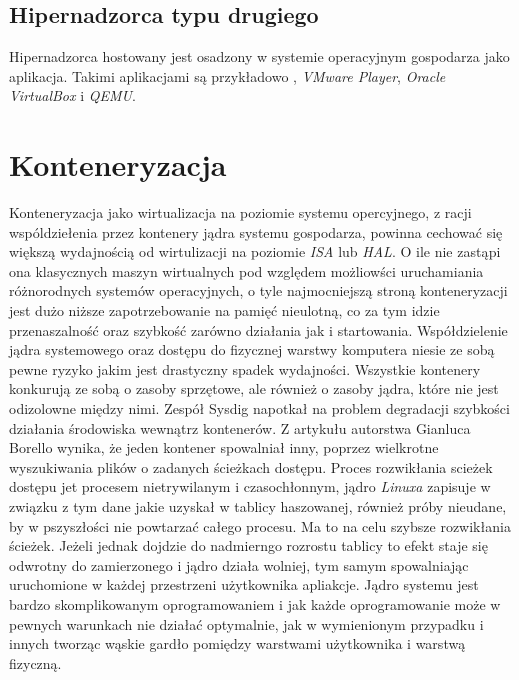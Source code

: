 \documentclass[polish, a4paper, 12pt, oneside]{book}
\begin{document}
\subsection {Hipernadzorca typu drugiego} 
Hipernadzorca hostowany jest osadzony w systemie operacyjnym gospodarza jako aplikacja. Takimi aplikacjami są przykładowo \cite{VMware Workstation}, \textit{VMware Player}\cite{vmwareplayer}, \textit{Oracle VirtualBox}\cite{virtualbox} i \textit{QEMU}\cite{qemu}.

\section{Konteneryzacja}
Konteneryzacja jako wirtualizacja na poziomie systemu opercyjnego, z racji wspóldziełenia przez kontenery jądra systemu gospodarza, powinna cechować się większą wydajnością od wirtulizacji na poziomie \textit{ISA} lub \textit{HAL}. O ile nie zastąpi ona klasycznych maszyn wirtualnych pod względem możliowści uruchamiania różnorodnych systemów operacyjnych, o tyle najmocniejszą stroną konteneryzacji jest dużo niższe zapotrzebowanie na pamięć nieulotną, co za tym idzie przenaszalność oraz szybkość zarówno działania jak i startowania. Współdzielenie jądra systemowego oraz dostępu do fizycznej warstwy komputera niesie ze sobą pewne ryzyko jakim jest drastyczny spadek wydajności. Wszystkie kontenery konkurują ze sobą o zasoby sprzętowe, ale również o zasoby jądra, które nie jest odizolowne między nimi. Zespół Sysdig napotkał na problem degradacji szybkości działania środowiska wewnątrz kontenerów. Z artykułu autorstwa Gianluca Borello\cite{sd17} wynika, że jeden kontener spowalniał inny, poprzez wielkrotne wyszukiwania plików o zadanych ścieżkach dostępu. Proces rozwikłania scieżek dostępu jet procesem nietrywilanym i czasochłonnym, jądro \textit{Linuxa} zapisuje w związku z tym dane jakie uzyskał w tablicy haszowanej, również próby nieudane, by w pszyszłości nie powtarzać całego procesu. Ma to na celu szybsze rozwikłania ścieżek. Jeżeli jednak dojdzie do nadmierngo rozrostu tablicy to efekt staje się odwrotny do zamierzonego i jądro działa wolniej, tym samym spowalniając uruchomione w każdej przestrzeni użytkownika apliakcje. Jądro systemu jest bardzo skomplikowanym oprogramowaniem i jak każde oprogramowanie może w pewnych warunkach nie działać optymalnie, jak w wymienionym przypadku i innych tworząc wąskie gardło pomiędzy warstwami użytkownika i warstwą fizyczną.
\end{document}
